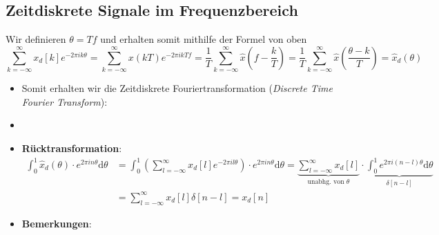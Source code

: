 \documentclass[11pt]{article}
\begin{document}
\subsection*{Zeitdiskrete Signale im Frequenzbereich}
\vspace*{-0.5cm}
Wir definieren $\theta = Tf$ und erhalten somit mithilfe der Formel von oben
$$\sum_{k=-\infty}^\infty x_d[k] e^{-2\pi i k \theta} = \sum_{k=-\infty}^\infty x(kT) e^{-2\pi i k T f} = \frac{1}{T}\sum_{k=-\infty}^{\infty}\hat{x}\left( f- \frac{k}{T} \right) = \frac{1}{T}\sum_{k=-\infty}^{\infty}\hat{x}\left( \frac{\theta - k}{T} \right) = \hat{x}_d(\theta)$$

\begin{itemize}[leftmargin = 0pt]
    \item[] Somit erhalten wir die Zeitdiskrete Fouriertransformation (\textit{Discrete Time Fourier Transform}):
    \item[] %
   \item[] \textbf{Rücktransformation}:
   \begin{align*}
       \int_0^1 \hat{x}_d(\theta) \cdot e^{2 \pi i n \theta}\text{d}\theta &= \int_0^1 \left( \sum_{l=-\infty}^\infty x_d[l]e^{-2\pi i l \theta} \right)\cdot e^{2 \pi i n \theta} \text{d}\theta = \underbrace{\sum_{l=-\infty}^\infty x_d[l]}_{\text{unabhg. von }\theta} \cdot \underbrace{\int_0^1 e^{2 \pi i (n-l)\theta} \text{d}\theta}_{\delta[n-l]} \\
       &= \sum_{l=-\infty}^\infty x_d[l]\delta[n-l] = x_d[n]
   \end{align*}
    \item[] \textbf{Bemerkungen}:
\end{itemize}
\vspace*{-1cm}
\end{document}
